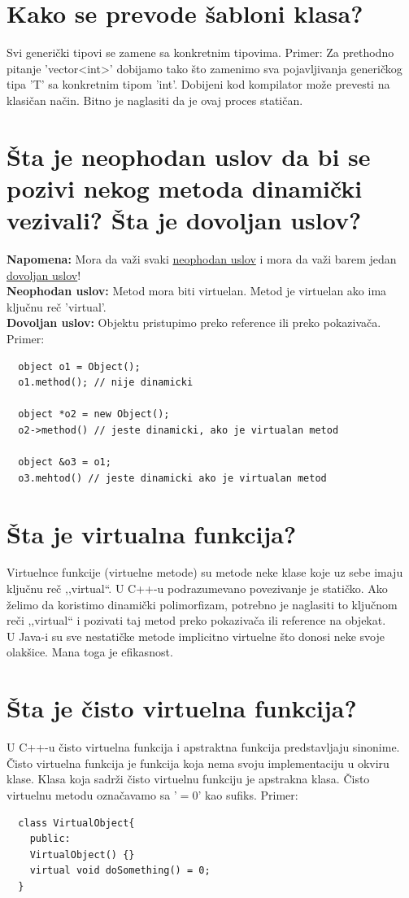 \documentclass[a4paper]{article}
\begin{document}
\section{Kako se prevode šabloni klasa?}
  Svi generički tipovi se zamene sa konkretnim tipovima.
  Primer: Za prethodno pitanje 'vector<int>' dobijamo tako što zamenimo sva pojavljivanja generičkog 
  tipa 'T' sa konkretnim tipom 'int'. Dobijeni kod kompilator može prevesti na klasičan način. 
  Bitno je naglasiti da je ovaj proces statičan.

\section{Šta je neophodan uslov da bi se pozivi nekog metoda dinamički vezivali? Šta je dovoljan uslov?}
  \textbf{Napomena:} Mora da važi svaki \underline{neophodan uslov} i 
  mora da važi barem jedan \underline{dovoljan uslov}!\\
  \textbf{Neophodan uslov:} Metod mora biti virtuelan. Metod je virtuelan ako ima ključnu reč 'virtual'.\\
  \textbf{Dovoljan uslov:} Objektu pristupimo preko reference ili preko pokazivača.
  Primer:
  \begin{lstlisting}
  object o1 = Object();
  o1.method(); // nije dinamicki

  object *o2 = new Object();
  o2->method() // jeste dinamicki, ako je virtualan metod

  object &o3 = o1;
  o3.mehtod() // jeste dinamicki ako je virtualan metod\end{lstlisting}
\section{Šta je virtualna funkcija?}
  Virtuelnce funkcije (virtuelne metode) su metode neke klase koje uz sebe imaju ključnu reč ,,virtual``.
  U C++-u podrazumevano povezivanje je statičko. Ako želimo da koristimo dinamički polimorfizam, potrebno je
  naglasiti to ključnom reči ,,virtual`` i pozivati taj metod preko pokazivača ili reference na objekat.\\
  \indent U Java-i su sve nestatičke metode implicitno virtuelne što donosi neke svoje olakšice. Mana 
  toga je efikasnost.

\section{Šta je čisto virtuelna funkcija?}
  U C++-u čisto virtuelna funkcija i apstraktna funkcija predstavljaju sinonime. Čisto virtuelna funkcija
  je funkcija koja nema svoju implementaciju u okviru klase. Klasa koja sadrži čisto virtuelnu funkciju
  je apstrakna klasa. Čisto virtuelnu metodu označavamo sa '$= 0$' kao sufiks.
  Primer:
  \begin{lstlisting}
  class VirtualObject{
    public:
    VirtualObject() {}
    virtual void doSomething() = 0;
  }\end{lstlisting}
\end{document}
